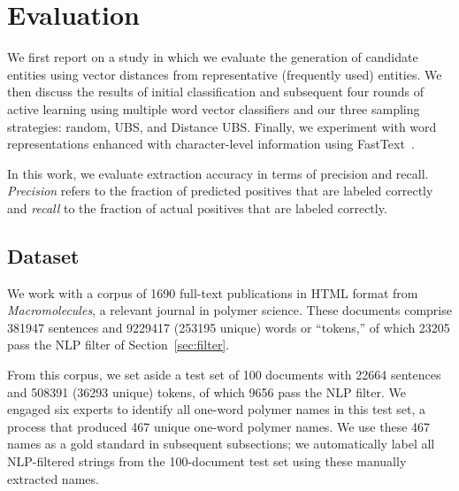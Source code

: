 \section{Evaluation}
\label{sect:apner_results}
We first report on a study in which we evaluate the generation of candidate entities using vector distances from representative (frequently used) entities. 
We then discuss the results of initial classification and subsequent four rounds of active learning using multiple word vector classifiers and our three sampling strategies: random, UBS, and Distance UBS.
Finally, we experiment with word representations enhanced with character-level information using FastText~\cite{bojanowski2016enriching,joulin2016bag}.

In this work, we evaluate extraction accuracy in terms of precision and recall.
\emph{Precision} refers to the fraction of predicted
positives that are labeled correctly and
\emph{recall} to the fraction of actual positives that
are labeled correctly.

\subsection{Dataset}\label{sec:dataset}

We work with a corpus of \num{1690} full-text publications in HTML format from \textit{Macromolecules}, 
a relevant journal in polymer science.
These documents comprise \num{381947} sentences and \num{9229417} (\num{253195} unique) words or ``tokens,''
of which \num{23205} pass the NLP filter of Section~\ref{sec:filter}.

From this corpus, 
we set aside a test set of 100 documents with  \num{22664} sentences and \num{508391} (\num{36293} unique) tokens,
of which \num{9656} pass the NLP filter.
We engaged six experts to identify all one-word polymer names in this test set,
a process that produced 467 unique one-word polymer names.
We use these 467 names as a gold standard in subsequent subsections; we automatically label all NLP-filtered strings from the 100-document test set using these manually extracted names.




